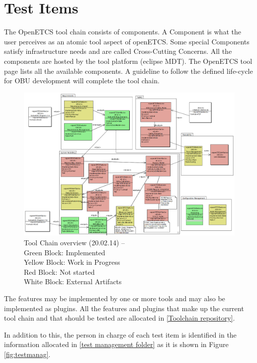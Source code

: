 \section{Test Items}
\label{sec:test_items}
The OpenETCS tool chain consists of components. A Component is what the user perceives as an atomic tool aspect of openETCS. Some special Components satisfy infrastructure needs and are called Cross-Cutting Concerns. All the components are hosted by the tool platform (eclipse MDT). The OpenETCS tool page lists all the available components. A guideline to follow the defined life-cycle for OBU development will complete the tool chain.

\begin{figure}[H]
\includegraphics[width=\textwidth]{ToolChainmodel}
\caption{\label{fig:overview} Tool Chain overview (20.02.14) -- \\
  Green Block: Implemented \\
  Yellow Block: Work in Progress \\
  Red Block: Not started \\
  White Block: External Artifacts} 
\end{figure}
The features may be implemented by one or more tools and may also be implemented as plugins.
All the features and plugins that make up the current tool chain and that should be tested are allocated in \href{https://github.com/openETCS/toolchain/tree/master/tool/bundles}{[Toolchain repository]}.

In addition to this, the person in charge of each test item is identified in the information allocated in \href{https://github.com/openETCS/toolchain/tree/master/tool/bundles/Tests/Tests%20Management}{[test management folder]} as it is shown in Figure \ref{fig:testmanag}.

